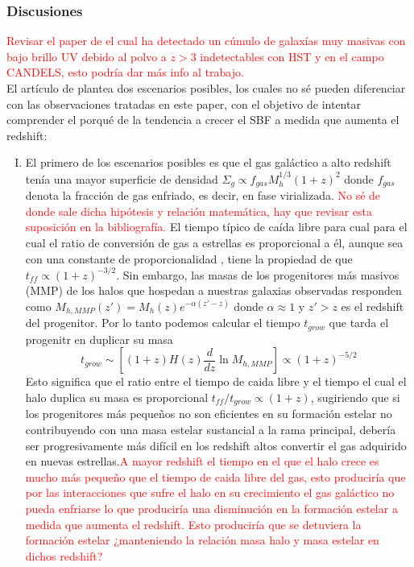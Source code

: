 \documentclass{article}
\begin{document}
\subsubsection*{Discusiones}
\textcolor{red}{Revisar el paper de \cite{wang2019dominant} el cual ha detectado un cúmulo de galaxías muy masivas con bajo brillo UV debido al polvo a $z>3$ indetectables con HST y en el campo CANDELS, esto podría dar más info al trabajo.}\\

El artículo de \cite{finkelstein2015increasing} plantea dos escenarios posibles, los cuales no sé pueden diferenciar con las observaciones tratadas en este paper, con el objetivo de intentar comprender el porqué de la tendencia a crecer el SBF a medida que aumenta el redshift:

\begin{enumerate}[I) ]
\item El primero de los escenarios posibles es que el gas galáctico a alto redshift tenía una mayor superficie de densidad $\Sigma_g \propto f_{gas}M_h^{1/3}(1+z)^2$ donde $f_{gas}$ denota la fracción de gas enfriado, es decir, en fase virializada. \textcolor{red}{No sé de donde sale dicha hipótesis y relación matemática, hay que revisar esta suposición en la bibliografía.} El tiempo típico de caída libre para cual para el cual el ratio de conversión de gas a estrellas es proporcional a él, aunque sea con una constante de proporcionalidad \citep{krumholz2011universal}, tiene la propiedad de que $t_{ff}\propto (1+z)^{-3/2}$. Sin embargo, las masas de los progenitores más masivos (MMP) de los halos que hospedan a nuestras galaxias observadas responden como $M_{h,MMP}(z')=M_h(z)e^{-\alpha(z'-z)}$ donde $\alpha \approx 1$ y $z'>z$ es el redshift del progenitor. Por lo tanto podemos calcular el tiempo $t_{grow}$ que tarda el progenitr en duplicar su masa $$t_{grow}\sim \left[(1+z)H(z)\frac{d}{dz}\ln M_{h,MMP}\right]\propto (1+z)^{-5/2}$$
Esto significa que el ratio entre el tiempo de caida libre y el tiempo el cual el halo duplica su masa es proporcional $t_{ff}/t_{grow}\propto (1+z)$, sugiriendo que si los progenitores más pequeños no son eficientes en su formación estelar no contribuyendo con una masa estelar sustancial a la rama principal, debería ser progresivamente más difícil en los redshift altos convertir el gas adquirido en nuevas estrellas.\textcolor{red}{A mayor redshift el tiempo en el que el halo crece es mucho más pequeño que el tiempo de caida libre del gas, esto produciría que por las interacciones que sufre el halo en su crecimiento el gas galáctico no pueda enfriarse lo que produciría una disminución en la formación estelar a medida que aumenta el redshift. Esto produciría que se detuviera la formación estelar ¿manteniendo la relación masa halo y masa estelar en dichos redshift?}


\end{enumerate}
\end{document}
